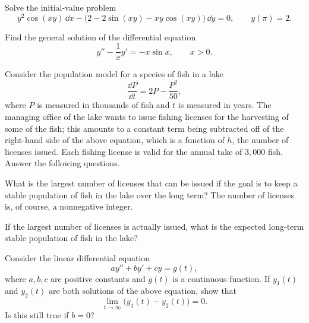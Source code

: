 \documentclass[11pt,oneside]{article}
\begin{document}
\begin{problem}
Solve the initial-value problem
\[
y^2\cos(xy)\,\dd x
-\bigl(2-2\sin(xy)-xy\cos(xy)\bigr)\,\dd y=0,
\qquad
y(\pi)=2.
\]
\end{problem}

\begin{problem}
Find the general solution of the differential equation
\[
y''-\frac{1}{x}y'=-x\sin x,
\qquad x>0.
\]
\end{problem}

\begin{problem}
Consider the population model for a species of fish in a lake
\[
\frac{\dd P}{\dd t}=2P-\frac{P^2}{50},
\]
where $P$ is measured in thousands of fish and $t$ is measured in years. The managing office of the lake wants to issue fishing licenses for the harvesting of some of the fish; this amounts to a constant term being subtracted off of the right-hand side of the above equation, which is a function of $h$, the number of licenses issued. Each fishing license is valid for the annual take of $3{,}000$ fish. Answer the following questions.
\begin{problemsubparts}
\item What is the largest number of licenses that can be issued if the goal is to keep a stable population of fish in the lake over the long term? The number of licenses is, of course, a nonnegative integer.
\item If the largest number of licenses is actually issued, what is the expected long-term stable population of fish in the lake?
\end{problemsubparts}
\end{problem}

\begin{problem}
Consider the linear differential equation
\[
ay''+by'+cy=g(t),
\]
where $a,b,c$ are positive constants and $g(t)$ is a continuous function. If $y_1(t)$ and $y_2(t)$ are both solutions of the above equation, show that
\[
\lim_{t\to\infty}\bigl(y_1(t)-y_2(t)\bigr)=0.
\]
Is this still true if $b=0$?
\end{problem}
\end{document}
